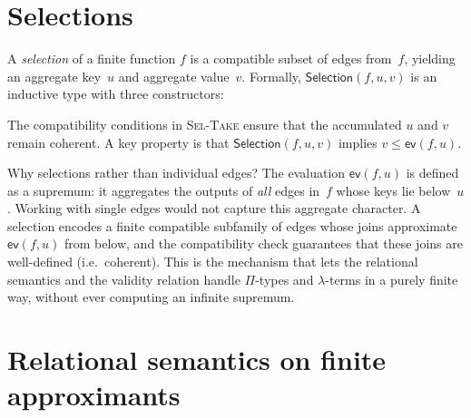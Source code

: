 \documentclass[11pt]{article}
\newcommand{\Bot}{\bot}
\newcommand{\EvalFun}{\mathsf{ev}}
\newcommand{\LeCode}{\leq}
\newcommand{\Sup}{\sqcup}
\begin{document}
\section{Selections}

A \emph{selection} of a finite function $f$ is a compatible subset
of edges from~$f$, yielding an aggregate key~$u$ and aggregate
value~$v$.  Formally, $\mathsf{Selection}(f, u, v)$ is an inductive
type with three constructors:
The compatibility conditions in \textsc{Sel-Take} ensure that the
accumulated $u$ and $v$ remain coherent.  A key property is that
$\mathsf{Selection}(f,u,v)$ implies $v \LeCode \EvalFun(f,u)$.

Why selections rather than individual edges?  The evaluation
$\EvalFun(f,u)$ is defined as a supremum: it aggregates the outputs
of \emph{all} edges in~$f$ whose keys lie below~$u$.  Working with
single edges would not capture this aggregate character.  A selection
encodes a finite compatible subfamily of edges whose joins approximate
$\EvalFun(f,u)$ from below, and the compatibility check guarantees
that these joins are well-defined (i.e.\ coherent).  This is the
mechanism that lets the relational semantics and the validity relation
handle $\Pi$-types and $\lambda$-terms in a purely finite way, without
ever computing an infinite supremum.

\section{Relational semantics on finite approximants}
\end{document}
